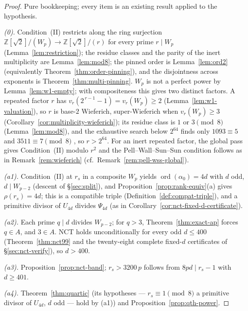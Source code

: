 \documentclass[11pt]{amsart}
\theoremstyle{plain}
\theoremstyle{definition}
\theoremstyle{remark}
\numberwithin{equation}{section}
\newcommand{\ord}{\operatorname{ord}}
\newcommand{\Z}{\mathbb{Z}}
\begin{document}
\begin{proof}
Pure bookkeeping; every item is an existing result applied to the
hypothesis.

\emph{(0).} Condition~(II) restricts along the ring surjection
$\Z[\sqrt 2]/(W_p) \to \Z[\sqrt 2]/(r)$ for every prime $r \mid W_p$
(Lemma~\ref{lem:restriction}); the residue classes and the
parity of the inert multiplicity are Lemma~\ref{lem:mod8}; the pinned
order is Lemma~\ref{lem:ord2} (equivalently
Theorem~\ref{thm:order-pinning}), and the disjointness across exponents
is Theorem~\ref{thm:multi-pinning}. $W_p$ is not a perfect power by
Lemma~\ref{lem:w1-empty}; with compositeness this gives two distinct
factors. A repeated factor $r$ has
$v_r(2^{\,r-1}-1) = v_r(W_p) \geq 2$ (Lemma~\ref{lem:w1-valuation}), so
$r$ is base-$2$ Wieferich, super-Wieferich when $v_r(W_p) \geq 3$
(Corollary~\ref{cor:multiplicity-wieferich}); its residue class is $1$
or $3 \pmod 8$ (Lemma~\ref{lem:mod8}), and the exhaustive search below
$2^{64}$ finds only $1093 \equiv 5$ and $3511 \equiv 7 \pmod 8$
\cite{ref:OEISWieferich}, so $r > 2^{64}$. For an inert repeated factor,
the global pass gives Condition~(II) modulo $r^2$ and the
Pell--Wall--Sun--Sun condition follows as in Remark~\ref{rem:wieferich}
(cf.\ Remark~\ref{rem:pell-wss-global}).

\emph{(a1).} Condition~(II) at $r_s$ in a composite $W_p$ yields
$\ord(\alpha_0) = 4d$ with $d$ odd, $d \mid W_{p-2}$ (descent of
\S\ref{sec:split}), and Proposition~\ref{prop:rank-equiv}(a) gives
$\rho(r_s) = 4d$; this is a compatible triple
(Definition~\ref{def:compat-triple}), and a primitive divisor of
$U_{4d}$ divides $\Psi_{4d}$ (as in
Corollary~\ref{cor:nct-fixed-d-certificate}).

\emph{(a2).} Each prime $q \mid d$ divides $W_{p-2}$; for $q > 3$,
Theorem~\ref{thm:exact-ap} forces $q \in A$, and $3 \in A$. NCT holds
unconditionally for every odd $d \leq 400$ (Theorem~\ref{thm:nct99} and
the twenty-eight complete fixed-$d$ certificates of
\S\ref{sec:nct-verify}), so $d > 400$.

\emph{(a3).} Proposition~\ref{prop:nct-band}; $r_s > 3200\,p$ follows
from $8 p d \mid r_s - 1$ with $d \geq 401$.

\emph{(a4).} Theorem~\ref{thm:quartic} (its hypotheses --- $r_s \equiv 1
\pmod 8$ a primitive divisor of $U_{4d}$, $d$ odd --- hold by (a1)) and
Proposition~\ref{prop:qth-power}.


\end{proof}
\end{document}

